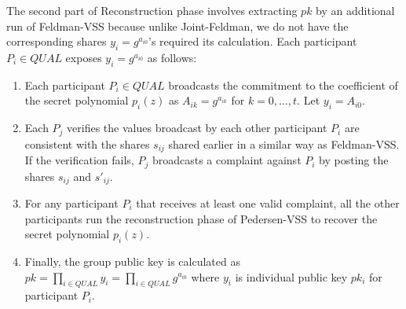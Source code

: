 \documentclass[letterpaper,twocolumn,10pt]{article}
\theoremstyle{definition}
\theoremstyle{remark}
\begin{document}
\begin{itemize}
\begin{enumerate}
    The second part of Reconstruction phase involves extracting $pk$ by an additional run of Feldman-VSS because unlike Joint-Feldman, we do not have the corresponding shares $y_i = g^{a_{i0}}$'s required its calculation. Each participant $P_i \in QUAL$ exposes $y_i = g^{a_{i0}}$ as follows:
        \begin{enumerate}
            \item Each participant $P_i \in QUAL$ broadcasts the commitment to the coefficient of the secret polynomial $p_i(z)$ as $A_{ik} = g^{a_{ik}}$ for $k = 0, \ldots, t$. Let $y_i = A_{i0}$.
            \item Each $P_j$ verifies the values broadcast by each other participant $P_i$ are consistent with the shares $s_{ij}$ shared earlier in a similar way as Feldman-VSS. If the verification fails, $P_j$ broadcasts a complaint against $P_i$ by posting the shares $s_{ij}$ and $s'_{ij}$.
            \item For any participant $P_i$ that receives at least one valid complaint, all the other participants run the reconstruction phase of Pedersen-VSS to recover the secret polynomial $p_i(z)$. 
            \item Finally, the group public key is calculated as $pk = \prod_{i \in QUAL} y_i = \prod_{i \in QUAL} g^{a_{i0}}$ where $y_i$ is individual public key $pk_i$ for participant $P_i$.
        \end{enumerate}
    \end{enumerate}
\end{itemize}
\end{document}
